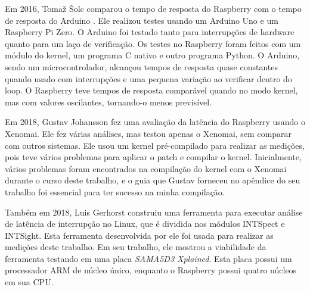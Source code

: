 Em 2016, Tomaž Šolc comparou o tempo de resposta do Raspberry com o tempo de resposta do Arduino \cite{Solc2016}. Ele realizou testes usando um Arduino Uno e um Raspberry Pi Zero. O Arduino foi testado tanto para interrupções de hardware quanto para um laço de verificação. Os testes no Raspberry foram feitos com um módulo do kernel, um programa C nativo e outro programa Python. O Arduino, sendo um microcontrolador, alcançou tempos de resposta quase constantes quando usado com interrupções e uma pequena variação ao verificar dentro do loop. O Raspberry teve tempos de resposta comparável quando no modo kernel, mas com valores oscilantes, tornando-o menos previsível.

Em 2018, Gustav Johansson \cite{Johansson2018} fez uma avaliação da latência do Raspberry usando o Xenomai. Ele fez várias análises, mas testou apenas o Xenomai, sem comparar com outros sistemas. Ele usou um kernel pré-compilado para realizar as medições, pois teve vários problemas para aplicar o patch e compilar o kernel. Inicialmente, vários problemas foram encontrados na compilação do kernel com o Xenomai durante o curso deste trabalho, e o guia que Gustav forneceu no apêndice do seu trabalho foi essencial para ter sucesso na minha compilação.

Também em 2018, Luis Gerhorst \cite{Gerhorst2018} construiu uma ferramenta para executar análise de latência de interrupção no Linux, que é dividida nos módulos INTSpect e INTSight. Esta ferramenta desenvolvida por ele foi usada para realizar as medições deste trabalho. Em seu trabalho, ele mostrou a viabilidade da ferramenta testando em uma placa \textit{SAMA5D3 Xplained}. Esta placa possui um processador ARM de núcleo único, enquanto o Raspberry possui quatro núcleos em sua CPU.

